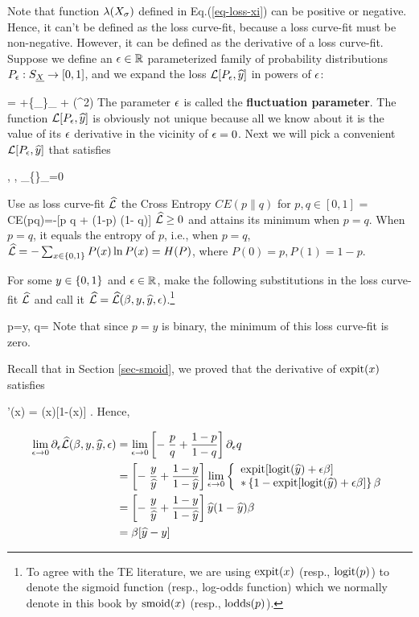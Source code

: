 Note that function $\lambda(X_\sigma)$ defined in Eq.(\ref{eq-loss-xi})
can be positive or negative. Hence,
 it can't be defined as the loss curve-fit,
because a loss curve-fit must be non-negative. However, it can be
defined as the derivative of a loss curve-fit. Suppose we define an $\epsilon\in{ \mathbb{R}}$
parameterized
family of probability distributions $P_\epsilon:S_{\underline{X}}\rightarrow [0,1]$,
and we expand the loss ${\cal L}[P_\epsilon, {\widehat{y}}]$
in powers of $\epsilon$:

\beq
{} = \call[P_0, \haty]
+\eps \{\partial_\eps {}\}_{} + \calo(\eps^2)
\eeq
The parameter $\epsilon$ is called the {\bf fluctuation parameter}.
The function ${\cal L}[P_\epsilon, {\widehat{y}}]$ is obviously
not unique because all we know about it
is the value of its $\epsilon$ derivative
in the vicinity of $\epsilon=0$. Next we will pick a convenient
${\cal L}[P_\epsilon, {\widehat{y}}]$ that satisfies

\beq
{},\quad
{}, \quad \partial_\eps \{\}_{}=0
\eeq


Use as loss curve-fit ${\widehat{{\cal L}}}$ the Cross Entropy
$CE(p\parallel q)$ for $p, q\in [0,1]$
\beq
\hatl = CE(p\parallel q)=-[p \ln q + (1-p) \ln(1- q)]
\eeq
${\widehat{{\cal L}}}\geq 0$ and attains its minimum when $p=q$.
When $p=q$, it equals the entropy of $p$,
i.e., when $p=q$, ${\widehat{{\cal L}}}=-\sum_{x\in \{0,1\}} P(x)\ln P(x)= H(P)$,
where $P(0)=p, P(1)=1-p$.

For some $y\in\{0,1\}$ and $\epsilon\in{ \mathbb{R}}$,
make the following
substitutions
in the loss curve-fit ${\widehat{{\cal L}}}$
and call it ${\widehat{{\cal L}}}={\widehat{{\cal L}}}(\beta, y, {\widehat{y}}, \epsilon)$.\footnote{To
agree with the TE literature,
we are using ${\rm expit}(x)$
(resp., ${\rm logit}(p)$) to denote
the sigmoid function (resp., log-odds function)
which we normally
denote in this book by
 ${\rm smoid}(x)$ (resp., ${\rm lodds}(p)$).}

\beq
p=y,
\quad
q= \expit[\logit(\haty) + \eps \beta ]
\eeq
Note that since $p=y$ is binary,
the minimum of this loss curve-fit is zero.


 Recall that in Section \ref{sec-smoid}, we proved that
 the derivative of ${\rm expit}(x)$ satisfies

\beq
\expit'(x) = \expit(x)[1-\expit(x)]
\;.
\eeq
Hence,

\begin{align}
\lim_{\epsilon\rightarrow 0}\partial_\epsilon {\widehat{{\cal L}}}(\beta, y, {\widehat{y}}, \epsilon)
&=
\lim_{\epsilon\rightarrow 0}
\left[-\;\frac{p}{q} + \frac{1-p}{1-q}\right]\partial_\epsilon q
\\
&=
\left[-\;\frac{y}{{\widehat{y}}} + \frac{1-y}{1-{\widehat{y}}}\right]
\lim_{\epsilon\rightarrow 0}
\left\{
\begin{array}{l}
{\rm expit}[{\rm logit}({\widehat{y}}) + \epsilon \beta ]
\\
*\left\{1-{\rm expit}[{\rm logit}({\widehat{y}}) + \epsilon \beta ]\right\}
\beta
\end{array}
\right.
\\
&=
\left[-\;\frac{y}{{\widehat{y}}} + \frac{1-y}{1-{\widehat{y}}}\right]
{\widehat{y}}(1-{\widehat{y}})\beta
\\
&=
\beta[{\widehat{y}}-y]
\end{align}

